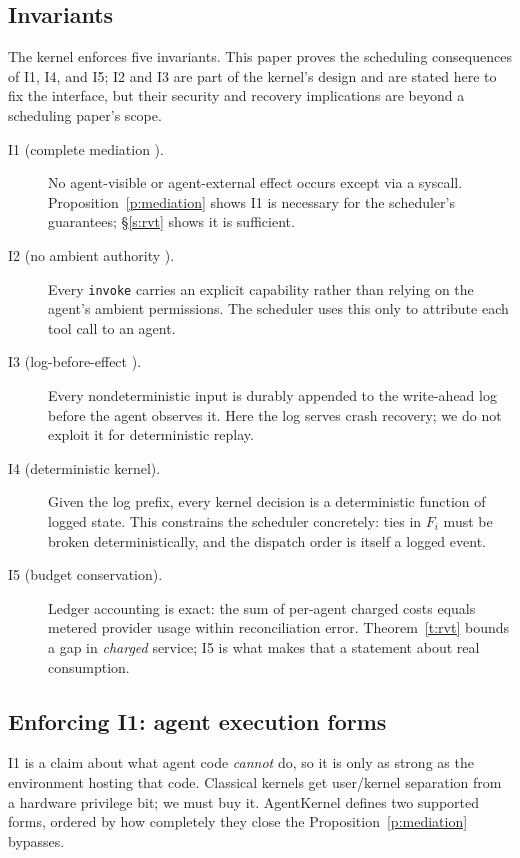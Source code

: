 \documentclass[letterpaper,11pt,leqno]{article}
\begin{document}
\subsection{Invariants}\label{s:invariants}

The kernel enforces five invariants. This paper proves the scheduling consequences of I1, I4, and I5; I2 and I3 are part of the kernel's design and are stated here to fix the interface, but their security and recovery implications are beyond a scheduling paper's scope.

\begin{description}
\item[I1 (complete mediation \citep{Saltzer75}).] No agent-visible or agent-external effect occurs except via a syscall. Proposition~\ref{p:mediation} shows I1 is necessary for the scheduler's guarantees; \S\ref{s:rvt} shows it is sufficient.
\item[I2 (no ambient authority \citep{Dennis66, Miller06}).] Every \texttt{invoke} carries an explicit capability rather than relying on the agent's ambient permissions. The scheduler uses this only to attribute each tool call to an agent.
\item[I3 (log-before-effect \citep{Mohan92}).] Every nondeterministic input is durably appended to the write-ahead log before the agent observes it. Here the log serves crash recovery; we do not exploit it for deterministic replay.
\item[I4 (deterministic kernel).] Given the log prefix, every kernel decision is a deterministic function of logged state. This constrains the scheduler concretely: ties in $F_i$ must be broken deterministically, and the dispatch order is itself a logged event.
\item[I5 (budget conservation).] Ledger accounting is exact: the sum of per-agent charged costs equals metered provider usage within reconciliation error. Theorem~\ref{t:rvt} bounds a gap in \emph{charged} service; I5 is what makes that a statement about real consumption.
\end{description}

\subsection{Enforcing I1: agent execution forms}\label{s:forms}

I1 is a claim about what agent code \emph{cannot} do, so it is only as strong as the environment hosting that code. Classical kernels get user/kernel separation from a hardware privilege bit; we must buy it. AgentKernel defines two supported forms, ordered by how completely they close the Proposition~\ref{p:mediation} bypasses.
\end{document}
